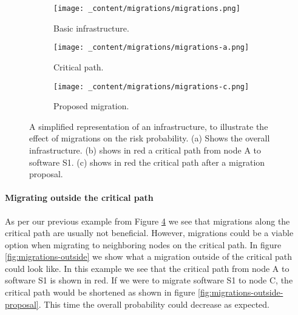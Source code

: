 \begin{figure}[H]
    \begin{subfigure}[b]{0.3\textwidth}
        \centering
        \texttt{[image: \_content/migrations/migrations.png]}
        \caption{Basic infrastructure.}
        \label{fig:migrations-infrastructure}
    \end{subfigure}
    \begin{subfigure}[b]{0.3\textwidth}
        \centering
        \texttt{[image: \_content/migrations/migrations-a.png]}
        \caption{Critical path.}
        \label{fig:migrations-basic}
    \end{subfigure}
    \begin{subfigure}[b]{0.3\textwidth}
        \centering
        \texttt{[image: \_content/migrations/migrations-c.png]}
        \caption{Proposed migration.}
        \label{fig:migrations-shortened}
    \end{subfigure}
    \caption{A simplified representation of an infrastructure, to illustrate the effect of migrations on the risk probability. (a) Shows the overall infrastructure. (b) shows in red a critical path from node A to software S1. (c) shows in red the critical path after a migration proposal.}
    \label{fig:migrations-example}
\end{figure}

\paragraph*{Migrating outside the critical path}
As per our previous example from Figure \ref{fig:migrations-example} we see that migrations along the critical path are usually not beneficial. However, migrations could be a viable option when migrating to neighboring nodes on the critical path. In figure \ref{fig:migrations-outside} we show what a migration outside of the critical path could look like. In this example we see that the critical path from node A to software S1 is shown in red. If we were to migrate software S1 to node C, the critical path would be shortened as shown in figure \ref{fig:migrations-outside-proposal}. This time the overall probability could decrease as expected.  

